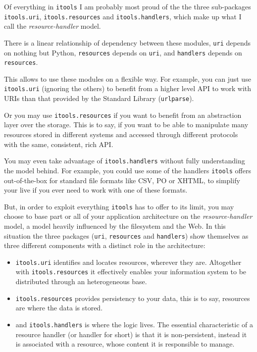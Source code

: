Of everything in {\tt itools} I am probably most proud of the the three
sub-packages {\tt itools.uri}, {\tt itools.resources} and
{\tt itools.handlers}, which make up what I call the {\em resource-handler}
model.

There is a linear relationship of dependency between these modules, {\tt uri}
depends on nothing but Python, {\tt resources} depends on {\tt uri}, and
{\tt handlers} depends on {\tt resources}.

This allows to use these modules on a flexible way. For example, you can
just use {\tt itools.uri} (ignoring the others) to benefit from a higher
level API to work with URIs than that provided by the Standard Library
({\tt urlparse}).

Or you may use {\tt itools.resources} if you want to benefit from an
abstraction layer over the storage. This is to say, if you want to be able
to manipulate many resources stored in different systems and accessed
through different protocols with the same, consistent, rich API.

You may even take advantage of {\tt itools.handlers} without fully
understanding the model behind. For example, you could use some of the
handlers {\tt itools} offers out-of-the-box for standard file formats
like CSV, PO or XHTML, to simplify your live if you ever need to work
with one of these formats.

But, in order to exploit everything {\tt itools} has to offer to its limit,
you may choose to base part or all of your application architecture on the
{\em resource-handler} model, a model heavily influenced by the filesystem
and the Web. In this situation the three packages ({\tt uri}, {\tt resources}
and {\tt handlers}) show themselves as three different components with
a distinct role in the architecture:

\begin{itemize}
  \item {\tt itools.uri} identifies and locates resources, wherever they
    are. Altogether with {\tt itools.resources} it effectively enables your
    information system to be distributed through an heterogeneous base.

  \item {\tt itools.resources} provides persistency to your data, this is
    to say, resources are where the data is stored.

  \item and {\tt itools.handlers} is where the logic lives. The essential
    characteristic of a resource handler (or handler for short) is that it is
    non-persistent, instead it is associated with a resource, whose content
    it is responsible to manage.
\end{itemize}

